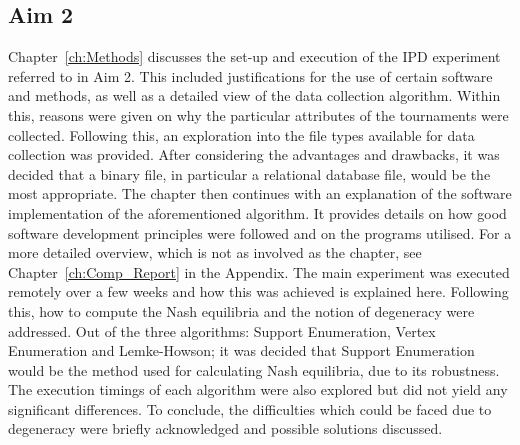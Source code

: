 \subsection{Aim 2}\label{subsec:Aim_2_concl}
Chapter~\ref{ch:Methods} discusses the set-up and execution of the IPD experiment
referred to in Aim 2. This included justifications for the use of certain
software and methods, as well as a detailed view of the data collection
algorithm. Within this, reasons were given on why the particular attributes
of the tournaments were collected. Following this, an exploration into the
file types available for data collection was provided. After considering
the advantages and drawbacks, it was decided that a binary file, in particular a
relational database file, would be the most appropriate. The chapter then
continues with an explanation of the software implementation of
the aforementioned algorithm. It provides details on how good software
development principles were followed and on the programs utilised. For a more
detailed overview, which is not as involved as the chapter, see
Chapter~\ref{ch:Comp_Report} in the Appendix. The
main experiment was executed remotely over a few weeks and how this was
achieved is explained here. Following this, how to compute the Nash equilibria
and the notion of degeneracy were addressed. Out of the three algorithms: Support
Enumeration, Vertex Enumeration and Lemke-Howson; it was decided that Support
Enumeration would be the method used for calculating Nash equilibria, due to
its robustness. The execution timings of each algorithm were also explored but
did not yield any significant differences. To conclude, the difficulties which
could be faced due to degeneracy were briefly acknowledged and possible
solutions discussed.

